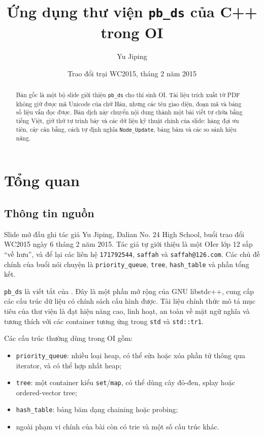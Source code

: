 \documentclass[11pt]{article}
\title{Ứng dụng thư viện \texttt{pb\_ds} của C++ trong OI}
\author{Yu Jiping}
\date{Trao đổi trại WC2015, tháng 2 năm 2015}
\begin{document}
\maketitle


\begin{abstract}
Bản gốc là một bộ slide giới thiệu \texttt{pb\_ds} cho thí sinh OI. Tài liệu
trích xuất từ PDF không giữ được mã Unicode của chữ Hán, nhưng các tên giao
diện, đoạn mã và bảng số liệu vẫn đọc được. Bản dịch này chuyển nội dung thành
một bài viết tự chứa bằng tiếng Việt, giữ thứ tự trình bày và các dữ liệu kỹ
thuật chính của slide: hàng đợi ưu tiên, cây cân bằng, cách tự định nghĩa
\texttt{Node\_Update}, bảng băm và các so sánh hiệu năng.
\end{abstract}

\tableofcontents

\section{Tổng quan}

\subsection*{Thông tin nguồn}

Slide mở đầu ghi tác giả Yu Jiping, Dalian No. 24 High School, buổi trao đổi
WC2015 ngày 6 tháng 2 năm 2015. Tác giả tự giới thiệu là một OIer lớp 12 sắp
``về hưu'', và để lại các liên hệ \texttt{171792544}, \texttt{saffah} và
\texttt{saffah@126.com}. Các chủ đề chính của buổi nói chuyện là
\texttt{priority\_queue}, \texttt{tree}, \texttt{hash\_table} và phần tổng kết.

\texttt{pb\_ds} là viết tắt của . Đây là
một phần mở rộng của GNU libstdc++, cung cấp các cấu trúc dữ liệu có chính
sách cấu hình được. Tài liệu chính thức mô tả mục tiêu của thư viện là đạt
hiệu năng cao, linh hoạt, an toàn về mặt ngữ nghĩa và tương thích với các
container tương ứng trong \texttt{std} và \texttt{std::tr1}.

Các cấu trúc thường dùng trong OI gồm:
\begin{itemize}
  \item \texttt{priority\_queue}: nhiều loại heap, có thể sửa hoặc xóa phần tử
  thông qua iterator, và có thể hợp nhất heap;
  \item \texttt{tree}: một container kiểu \texttt{set}/\texttt{map}, có thể
  dùng cây đỏ-đen, splay hoặc ordered-vector tree;
  \item \texttt{hash\_table}: bảng băm dạng chaining hoặc probing;
  \item ngoài phạm vi chính của bài còn có trie và một số cấu trúc khác.
\end{itemize}
\end{document}
